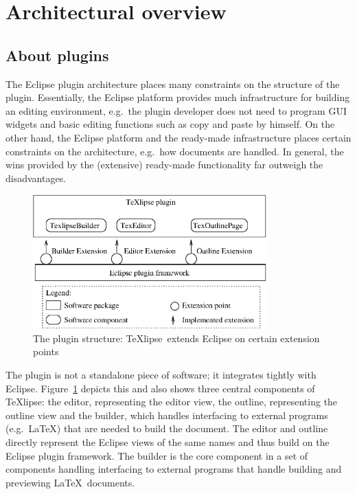 \documentclass[a4paper,11pt,twoside]{article}
\newcommand{\texlipse}{\TeX lipse}
\begin{document}
\section{Architectural overview}
\label{sect:archover}

\subsection{About plugins}

The Eclipse plugin architecture places many constraints on the structure of the 
plugin. Essentially, the Eclipse platform provides much infrastructure for 
building an editing environment, e.g.\ the plugin developer does not need to 
program GUI widgets and basic editing functions such as copy and paste by 
himself. On the other hand, the Eclipse platform and the ready-made 
infrastructure places certain constraints on the architecture, e.g.\ how 
documents are handled. In general, the wins provided by the (extensive) 
ready-made functionality far outweigh the disadvantages.

\begin{figure}[!htp]
\begin{center}
\includegraphics[width=9cm]{images/plugin}
\caption{The plugin structure: \texlipse\ extends Eclipse on certain extension points}
\label{fig:plugin}
\end{center}
\end{figure}

The plugin is not a standalone piece of software; it integrates tightly with 
Eclipse. Figure~\ref{fig:plugin} depicts this and also shows three central 
components of \texlipse: the editor, representing the editor view, the outline, 
representing the outline view and the builder, which handles interfacing to 
external programs (e.g.\ \LaTeX) that are needed to build the document. The 
editor and outline directly represent the Eclipse views of the same names and 
thus build on the Eclipse plugin framework. The builder is the core component 
in a set of components handling interfacing to external programs that handle 
building and previewing \LaTeX\ documents.
\end{document}
